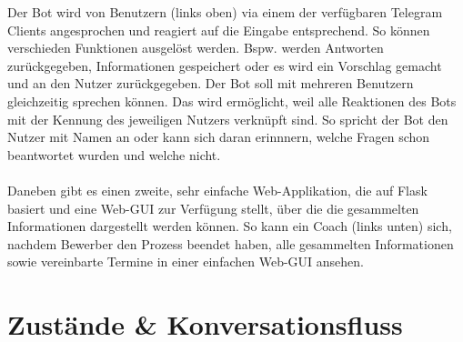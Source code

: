 	Der Bot wird von Benutzern (links oben) via einem der verfügbaren Telegram Clients angesprochen und reagiert auf die Eingabe entsprechend. So können verschieden Funktionen ausgelöst werden. Bspw. werden Antworten zurückgegeben, Informationen gespeichert oder es wird ein Vorschlag gemacht und an den Nutzer zurückgegeben. Der Bot soll mit mehreren Benutzern gleichzeitig sprechen können. Das wird ermöglicht, weil alle Reaktionen des Bots mit der Kennung des jeweiligen Nutzers verknüpft sind. So spricht der Bot den Nutzer mit Namen an oder kann sich daran erinnnern, welche Fragen schon beantwortet wurden und welche nicht. \\ \\

	Daneben gibt es einen zweite, sehr einfache Web-Applikation, die auf Flask basiert und eine Web-GUI zur Verfügung stellt, über die die gesammelten Informationen dargestellt werden können. So kann ein Coach (links unten) sich, nachdem Bewerber den Prozess beendet haben, alle gesammelten Informationen sowie vereinbarte Termine in einer einfachen Web-GUI ansehen.

\section{Zustände \& Konversationsfluss}

